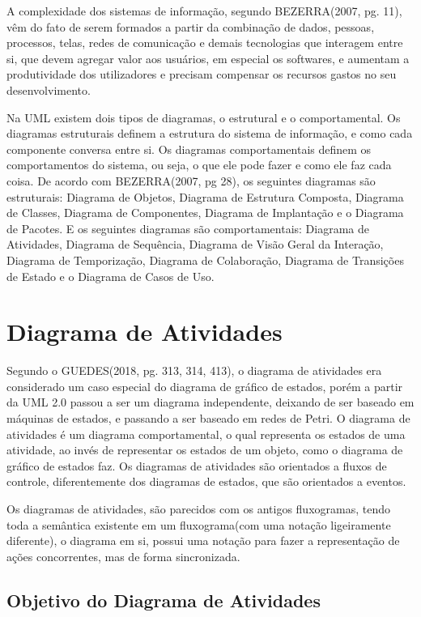 \documentclass[12pt,openright,oneside,a4paper,
	chapter=TITLE,
	section=TITLE,
	english,brazil]{abntex2}
\begin{document}
A complexidade dos sistemas de informação, segundo BEZERRA(2007, pg. 11), vêm do fato de serem formados a partir da combinação de dados, pessoas, processos, telas, redes de comunicação e demais tecnologias que interagem entre si, que devem agregar valor aos usuários, em especial os softwares, e aumentam a produtividade dos utilizadores e precisam compensar os recursos gastos no seu desenvolvimento.

Na UML existem dois tipos de diagramas, o estrutural e o comportamental. Os diagramas estruturais definem a estrutura do sistema de informação, e como cada componente conversa entre si. Os diagramas comportamentais definem os comportamentos do sistema, ou seja, o que ele pode fazer e como ele faz cada coisa. De acordo com BEZERRA(2007, pg 28), os seguintes diagramas são estruturais: Diagrama de Objetos, Diagrama de Estrutura Composta, Diagrama de Classes, Diagrama de Componentes, Diagrama de Implantação e o Diagrama de Pacotes. E os seguintes diagramas são comportamentais: Diagrama de Atividades, Diagrama de Sequência, Diagrama de Visão Geral da Interação, Diagrama de Temporização, Diagrama de Colaboração, Diagrama de Transições de Estado e o Diagrama de Casos de Uso.

\chapter{Diagrama de Atividades}

Segundo o GUEDES(2018, pg. 313, 314, 413), o diagrama de atividades era considerado um caso especial do diagrama de gráfico de estados, porém a partir da UML 2.0 passou a ser um diagrama independente, deixando de ser baseado em máquinas de estados, e passando a ser baseado em redes de Petri. O diagrama de atividades é um diagrama comportamental, o qual representa os estados de uma atividade, ao invés de representar os estados de um objeto, como o diagrama de gráfico de estados faz. Os diagramas de atividades são orientados a fluxos de controle, diferentemente dos diagramas de estados, que são orientados a eventos.

Os diagramas de atividades, são parecidos com os antigos fluxogramas, tendo toda a semântica existente em um fluxograma(com uma notação ligeiramente diferente), o diagrama em si, possui uma notação para fazer a representação de ações concorrentes, mas de forma sincronizada.

\section{Objetivo do Diagrama de Atividades}
\end{document}
